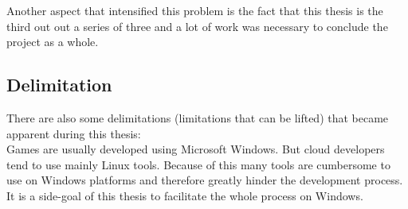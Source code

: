Another aspect that intensified this problem is the fact that this thesis is the
third out out a series of three and a lot of work was necessary to conclude the
project as a whole.

\subsection{Delimitation}

There are also some delimitations (limitations that can be lifted) that became
apparent during this thesis:\\

Games are usually developed using Microsoft Windows. But cloud developers tend
to use mainly Linux tools. Because of this many tools are cumbersome to use on
Windows platforms and therefore greatly hinder the development process. It is a
side-goal of this thesis to facilitate the whole process on Windows. 



















